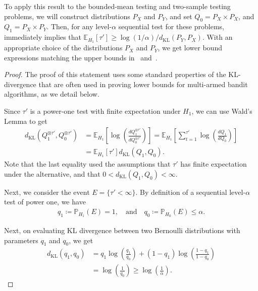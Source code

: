 \documentclass[10pt,a4paper]{amsart}
\newcommand*{\defined}{\coloneqq}
\newcommand{\dkl}{d_{\mathrm{KL}}}
\newcommand{\lb}{\left [}
\newcommand{\lp}{\left (} %
\newcommand{\rb}{\right ]}
\newcommand{\rp}{\right )} %
\begin{document}
        \begin{remark}
            To apply this result to the bounded-mean testing and two-sample testing problems, we will construct distributions $P_X$ and $P_Y$, and set $Q_0 = P_X \times P_X$, and $Q_1 = P_X \times P_Y$. Then, for any level-$\alpha$ sequential test for these problems,~ immediately implies that $\mathbb{E}_{H_1}[\tau'] \geq \log(1/\alpha)/\dkl(P_Y, P_X)$. With an appropriate choice of the distributions $P_X$ and $P_Y$, we get lower bound expressions matching the upper bounds in~ and~.
        \end{remark}

        \begin{proof}
         The proof of this statement uses some standard properties of the KL-divergence that are often used in proving lower bounds for multi-armed bandit algorithms, as we detail below.  

        Since $\tau'$ is a power-one test with finite expectation under $H_1$, we can use Wald's Lemma to get 
        \begin{align}
            \dkl\lp Q_1^{\otimes \tau'}, Q_0^{\otimes \tau'} \rp &= \mathbb{E}_{H_1} \lb \log \lp \frac{dQ_1^{\otimes \tau'}}{dQ_0^{\otimes \tau'}} \rp \rb
             = \mathbb{E}_{H_1} \lb \sum_{t=1}^{\tau'} \log \lp \frac{dQ_1}{dQ_0} \rp \rb \\
             & = \mathbb{E}_{H_1}[\tau'] \dkl(Q_1, Q_0). \label{eq:lower-general-1}
        \end{align}
        Note that the last equality used the assumptions that $\tau'$ has finite expectation under the alternative, and that $0<\dkl(Q_1, Q_0)<\infty$. 

        Next, we consider the event $E = \{\tau' < \infty\}$. By definition of a sequential level-$\alpha$ test of power one, we have 
        \begin{align}
            q_1 \defined \mathbb{P}_{H_1}\lp E \rp = 1, \quad \text{and} \quad 
            q_0 \defined \mathbb{P}_{H_0} \lp E \rp \leq \alpha. 
        \end{align}

        Next, on evaluating KL divergence between two Bernoulli distributions with parameters $q_1$ and $q_0$, we get
        \begin{align}
            \dkl(q_1, q_0) &= q_1 \log \lp \frac{q_1}{q_0} \rp + (1-q_1) \log \lp \frac{1-q_1}{1-q_0} \rp \\
            & = \log \lp \frac{1}{q_0} \rp \geq \log \lp \frac{1}{\alpha} \rp. \label{eq:lower-general-2}
        \end{align}


\end{proof}
\end{document}
